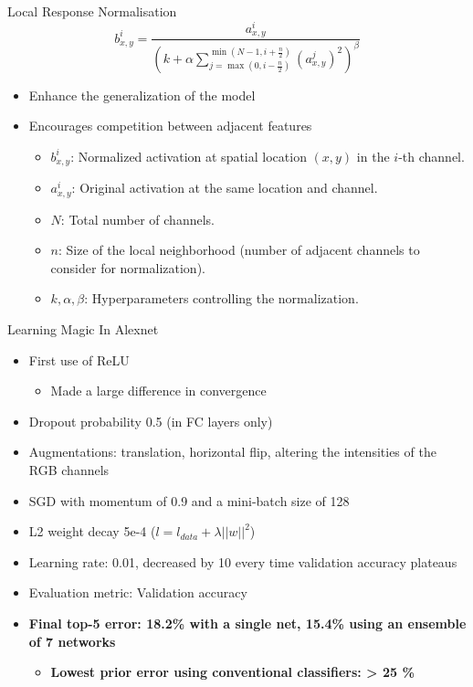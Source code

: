 \documentclass[serif, aspectratio=169]{beamer}
\begin{document}
\begin{frame}{Local Response Normalisation}
	\[
	b_{x, y}^i = \frac{a_{x, y}^i}{\left( k + \alpha \sum_{j=\max(0, i - \frac{n}{2})}^{\min(N - 1, i + \frac{n}{2})} \left( a_{x, y}^j \right)^2 \right)^\beta}
	\]
	\begin{itemize}
		\item Enhance the generalization of the model
		\item Encourages competition between adjacent features
		\vspace{1em}
		\begin{itemize}
			\item \( b_{x, y}^i \): Normalized activation at spatial location \((x, y)\) in the \(i\)-th channel.
			\item \( a_{x, y}^i \): Original activation at the same location and channel.
			\item \( N \): Total number of channels.
			\item \( n \): Size of the local neighborhood (number of adjacent channels to consider for normalization).
			\item \( k, \alpha, \beta \): Hyperparameters controlling the normalization.
		\end{itemize}
	\end{itemize}
\end{frame}

\begin{frame}{Learning Magic In Alexnet}
	\begin{itemize}
		\item First use of ReLU
		\begin{itemize}
			\item Made a large difference in convergence
		\end{itemize}
		\item Dropout probability 0.5 (in FC layers only)
		\item Augmentations: translation, horizontal flip, altering the intensities of the RGB channels
		\item SGD with momentum of 0.9 and a mini-batch size of 128
		\item L2 weight decay 5e-4 ($l=l_{data} + \lambda||w||^2$)
		\item Learning rate: 0.01, decreased by 10 every time validation accuracy plateaus
		\item Evaluation metric: Validation accuracy
		\item \textbf{Final top-5 error: 18.2\% with a single net, 15.4\% using an ensemble of 7 networks}
		\begin{itemize}
			\item \textbf{Lowest prior error using conventional classifiers: > 25 \%}
		\end{itemize}
	\end{itemize}
\end{frame}
\end{document}
